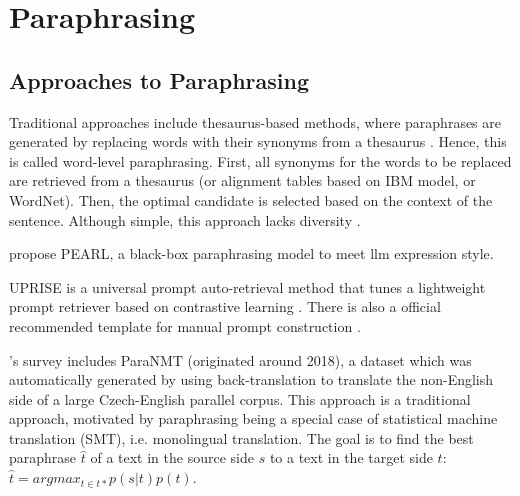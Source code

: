 \section{Paraphrasing}
\label{sec:paraphrasing}
\newcommand{\bluert}{\href{https://github.com/google-research/bleurt}{BLUERT}}

\subsection{Approaches to Paraphrasing}

Traditional approaches include thesaurus-based methods, where paraphrases are generated by 
replacing words with their synonyms from a thesaurus \cite{zhou_paraphrase_2021}.
Hence, this is called word-level paraphrasing.
First, all synonyms for the words to be replaced are retrieved from a thesaurus 
(or alignment tables based on IBM model, or WordNet).
Then, the optimal candidate is selected based on the context of the sentence. 
Although simple, this approach lacks diversity \cite{zhou_paraphrase_2021}.

\citet{fu_learning_2024} propose PEARL, a black-box paraphrasing model to meet \ac{llm} expression style.

UPRISE is a universal prompt auto-retrieval method that tunes a lightweight prompt retriever based on contrastive learning \cite{fu_learning_2024}.
There is also a official recommended template for manual prompt construction \cite{fu_learning_2024}.

\citet{zhou_paraphrase_2021}'s survey includes ParaNMT (originated around 2018), 
a dataset which was automatically generated by using 
back-translation to translate the non-English side of a large Czech-English parallel corpus.
This approach is a traditional approach, motivated by paraphrasing being a special case of statistical machine translation (SMT), 
i.e. monolingual translation. 
The goal is to find the best paraphrase $\hat{t}$ of a 
text in the source side $s$ to a text in the target side $t$: 
$ \hat{t} = argmax_{t \in t*} p(s|t)p(t) $.

